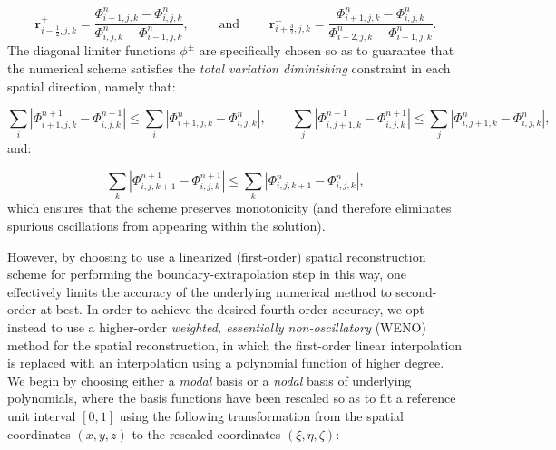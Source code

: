\documentclass{article}
\begin{document}
\begin{equation}
\mathbf{r}_{i - \frac{1}{2}, j, k}^{+} = \frac{\Phi_{i + 1, j, k}^{n} - \Phi_{i, j, k}^{n}}{\Phi_{i, j, k}^{n} - \Phi_{i - 1, j, k}^{n}}, \qquad \text{ and } \qquad \mathbf{r}_{i + \frac{3}{2}, j, k}^{-} = \frac{\Phi_{i + 1, j, k}^{n} - \Phi_{i, j, k}^{n}}{\Phi_{i + 2, j, k}^{n} - \Phi_{i + 1, j, k}^{n}}.
\end{equation}
The diagonal limiter functions ${\phi^{\pm}}$ are specifically chosen so as to guarantee that the numerical scheme satisfies the \textit{total variation diminishing} constraint in each spatial direction, namely that:

\begin{equation}
\sum_{i} \left\lvert \Phi_{i + 1, j, k}^{n + 1} - \Phi_{i, j, k}^{n + 1} \right\rvert \leq \sum_{i} \left\lvert \Phi_{i + 1, j, k}^{n} - \Phi_{i, j, k}^{n} \right\rvert, \qquad \sum_{j} \left\lvert \Phi_{i, j + 1, k}^{n + 1} - \Phi_{i, j, k}^{n + 1} \right\rvert \leq \sum_{j} \left\lvert \Phi_{i, j + 1, k}^{n} - \Phi_{i, j, k}^{n} \right\rvert,
\end{equation}
and:

\begin{equation}
\sum_{k} \left\lvert \Phi_{i, j, k + 1}^{n + 1} - \Phi_{i, j, k}^{n + 1} \right\rvert \leq \sum_{k} \left\lvert \Phi_{i, j, k + 1}^{n} - \Phi_{i, j, k}^{n} \right\rvert,
\end{equation}
which ensures that the scheme preserves monotonicity (and therefore eliminates spurious oscillations from appearing within the solution).

However, by choosing to use a linearized (first-order) spatial reconstruction scheme for performing the boundary-extrapolation step in this way, one effectively limits the accuracy of the underlying numerical method to second-order at best. In order to achieve the desired fourth-order accuracy, we opt instead to use a higher-order \textit{weighted, essentially non-oscillatory} (WENO) method for the spatial reconstruction\cite{jiang}\cite{jiang2}, in which the first-order linear interpolation is replaced with an interpolation using a polynomial function of higher degree. We begin by choosing either a \textit{modal} basis or a \textit{nodal} basis of underlying polynomials, where the basis functions have been rescaled so as to fit a reference unit interval ${\left[ 0, 1 \right]}$ using the following transformation from the spatial coordinates ${\left( x, y, z \right)}$ to the rescaled coordinates ${\left( \xi, \eta, \zeta \right)}$:
\end{document}
